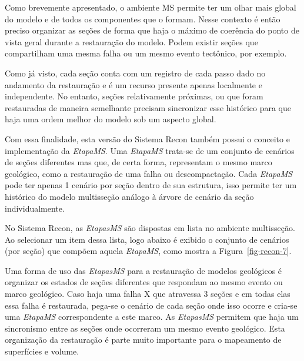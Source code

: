 Como brevemente apresentado, o ambiente MS permite ter um olhar mais global do modelo e de todos os componentes que o formam. Nesse contexto é então preciso organizar as seções de forma que haja o máximo de coerência do ponto de vista geral durante a restauração do modelo. Podem existir seções que compartilham uma mesma falha ou um mesmo evento tectônico, por exemplo.

Como já visto, cada seção conta com um registro de cada passo dado no andamento da restauração e é um recurso presente apenas localmente e independente. No entanto, seções relativamente próximas, ou que foram restauradas de maneira semelhante precisam sincronizar esse histórico para que haja uma ordem melhor do modelo sob um aspecto global.

Com essa finalidade, esta versão do Sistema Recon também possui o conceito e implementação da \textit{EtapaMS}. Uma \textit{EtapaMS} trata-se de um conjunto de cenários de seções diferentes mas que, de certa forma, representam o mesmo marco geológico, como a restauração de uma falha ou descompactação. Cada \textit{EtapaMS} pode ter apenas 1 cenário por seção dentro de sua estrutura, isso permite ter um histórico do modelo multisseção análogo à árvore de cenário da seção individualmente.

No Sistema Recon, as \textit{EtapasMS} são dispostas em lista no ambiente multisseção. Ao selecionar um item dessa lista, logo abaixo é exibido o conjunto de cenários (por seção) que compõem aquela \textit{EtapaMS}, como mostra a Figura~\ref{fig-recon-7}.

Uma forma de uso das \textit{EtapasMS} para a restauração de modelos geológicos é organizar os estados de seções diferentes que respondam ao mesmo evento ou marco geológico. Caso haja uma falha X que atravessa 3 seções e em todas elas essa falha é restaurada, pega-se o cenário de cada seção onde isso ocorre e cria-se uma \textit{EtapaMS} correspondente a este marco. As \emph{EtapasMS} permitem que haja um sincronismo entre as seções onde ocorreram um mesmo evento geológico. Esta organização da restauração é parte muito importante para o mapeamento de superfícies e volume.


